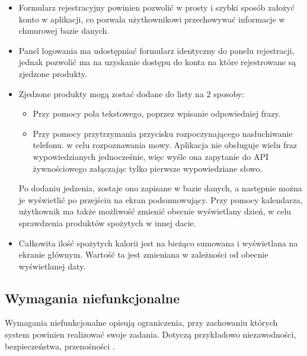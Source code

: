 \documentclass[12pt, a4paper]{article}
\begin{document}
\begin{sloppypar}
{{    \begin{itemize}
      \item Formularz rejestracyjny powinien pozwolić w prosty i szybki sposób założyć 
      konto w aplikacji, co pozwala użytkownikowi przechowywać informacje w 
      chmurowej bazie danych.
      \item Panel logowania ma udostępniać formularz identyczny do panelu rejestracji,
      jednak pozwolić ma na uzyskanie dostępu do konta na które rejestrowane są
      zjedzone produkty.
      \item Zjedzone produkty mogą zostać dodane do listy na 2 sposoby:
        \begin{itemize}
          \item Przy pomocy pola tekstowego, poprzez wpisanie odpowiedniej frazy.
          \item Przy pomocy przytrzymania przycisku rozpoczynającego nasłuchiwanie telefonu.
          w celu rozpoznawania mowy. Aplikacja nie obsługuje wielu fraz wypowiedzianych
          jednocześnie, więc wyśle ona zapytanie do API żywnościowego załączając tylko 
          pierwsze wypowiedziane słowo.
        \end{itemize}
        Po dodaniu jedzenia, zostaje ono zapisane w bazie danych, a następnie można je
        wyświetlić po przejściu na ekran podsumowujący. Przy pomocy kalendarza,
        użytkownik ma także możliwość zmienić obecnie wyświetlany dzień, w celu
        sprawdzenia produktów spożytych w innej dacie.
      \item Całkowita ilość spożytych kalorii jest na bieżąco sumowana i wyświetlana na
      ekranie głównym. Wartość ta jest zmieniana w zależności od obecnie wyświetlanej daty. 
    \end{itemize}
  }
  \subsection{Wymagania niefunkcjonalne}
  {
    Wymagania niefunkcjonalne opisują ograniczenia, przy zachowaniu których system
    powinien realizować swoje zadania. Dotyczą przykładowo niezawodności, bezpieczeństwa,
    przenośności \cite{funk-niefunk}.

}}
\end{sloppypar}
\end{document}
